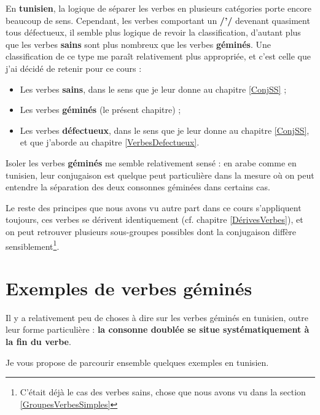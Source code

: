 En \textbf{tunisien}, la logique de séparer les verbes en plusieurs catégories porte encore beaucoup de sens. Cependant, les verbes comportant un \textbf{/'/} devenant quasiment tous défectueux, il semble plus logique de revoir la classification, d'autant plus que les verbes \textbf{sains} sont plus nombreux que les verbes \textbf{géminés}. Une classification de ce type me paraît relativement plus appropriée, et c'est celle que j'ai décidé de retenir pour ce cours : 
\begin{itemize}
    \item Les verbes \textbf{sains}, dans le sens que je leur donne au chapitre \ref{ConjSS} ;
    \item Les verbes \textbf{géminés} (le présent chapitre) ;
    \item Les verbes \textbf{défectueux}, dans le sens que je leur donne au chapitre \ref{ConjSS}, et que j'aborde au chapitre \ref{VerbesDefectueux}.
\end{itemize}

Isoler les verbes \textbf{géminés} me semble relativement sensé : en arabe comme en tunisien, leur conjugaison est quelque peut particulière dans la mesure où on peut entendre la séparation des deux consonnes géminées dans certains cas. 

Le reste des principes que nous avons vu autre part dans ce cours s'appliquent toujours, ces verbes se dérivent identiquement (cf. chapitre \ref{DérivesVerbes}), et on peut retrouver plusieurs sous-groupes possibles dont la conjugaison diffère sensiblement\footnote{C'était déjà le cas des verbes sains, chose que nous avons vu dans la section \ref{GroupesVerbesSimples}}. 

\section{Exemples de verbes géminés}
Il y a relativement peu de choses à dire sur les verbes géminés en tunisien, outre leur forme particulière : \textbf{la consonne doublée se situe systématiquement à la fin du verbe}. 

Je vous propose de parcourir ensemble quelques exemples en tunisien.

